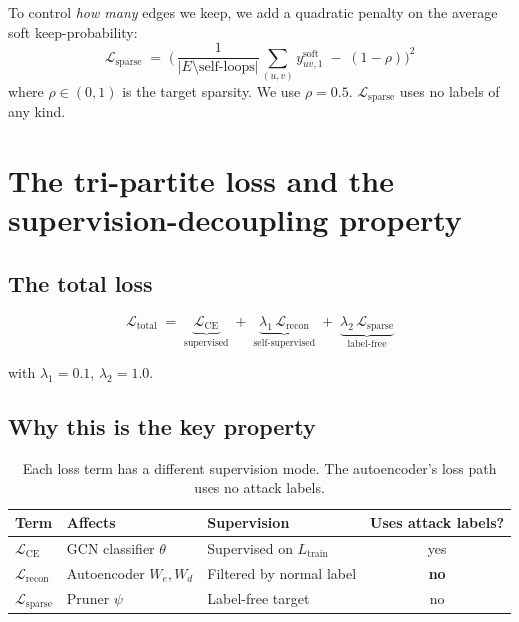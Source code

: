 \documentclass[11pt,a4paper]{article}
\begin{document}
To control \emph{how many} edges we keep, we add a quadratic penalty
on the average soft keep-probability:
\begin{equation}
\mathcal{L}_{\text{sparse}}
\;=\; \Bigg(\,\frac{1}{|E\setminus\text{self-loops}|}
                \sum_{(u,v)} y^{\text{soft}}_{uv,1} \;-\; (1-\rho)\Bigg)^{\!2}
\label{eq:lsparse}
\end{equation}
where $\rho \in (0,1)$ is the target sparsity. We use $\rho = 0.5$.
$\mathcal{L}_{\text{sparse}}$ uses no labels of any kind.

\section{The tri-partite loss and the supervision-decoupling property}

\subsection{The total loss}

\begin{equation}
\boxed{\;\mathcal{L}_{\text{total}}
\;=\; \underbrace{\mathcal{L}_{\text{CE}}}_{\text{supervised}}
\;+\; \underbrace{\lambda_1\,\mathcal{L}_{\text{recon}}}_{\text{self-supervised}}
\;+\; \underbrace{\lambda_2\,\mathcal{L}_{\text{sparse}}}_{\text{label-free}}\;}
\label{eq:total}
\end{equation}

with $\lambda_1 = 0.1$, $\lambda_2 = 1.0$.

\subsection{Why this is the key property}

\begin{table}[h]
\centering
\caption{Each loss term has a different supervision mode. The
autoencoder's loss path uses no attack labels.}
\begin{tabular}{lllc}
\toprule
\textbf{Term} & \textbf{Affects} & \textbf{Supervision} & \textbf{Uses attack labels?} \\
\midrule
$\mathcal{L}_{\text{CE}}$ & GCN classifier $\theta$ & Supervised on $L_{\text{train}}$ & yes \\
$\mathcal{L}_{\text{recon}}$ & Autoencoder $W_e, W_d$ & Filtered by normal label & \textbf{no} \\
$\mathcal{L}_{\text{sparse}}$ & Pruner $\psi$ & Label-free target & no \\
\bottomrule
\end{tabular}
\end{table}
\end{document}
